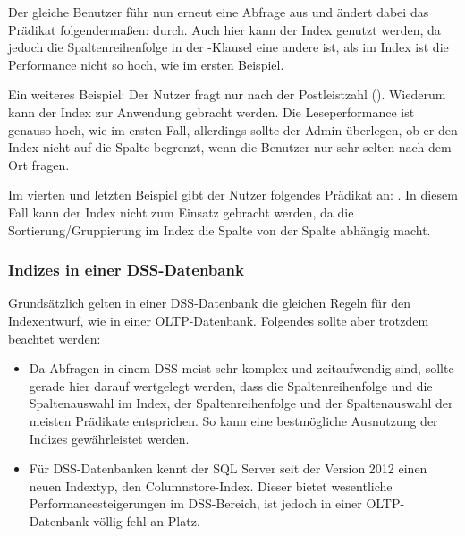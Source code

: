          Der gleiche Benutzer führ nun erneut eine Abfrage aus und ändert dabei
          das Prädikat folgendermaßen:
           durch. Auch
          hier kann der Index genutzt werden, da jedoch die Spaltenreihenfolge
          in der \WHERE-Klausel eine andere ist, als im Index ist die
          Performance nicht so hoch, wie im ersten Beispiel.
          
          Ein weiteres Beispiel: Der Nutzer fragt nur nach der Postleistzahl
          (). Wiederum kann der Index zur
          Anwendung gebracht werden. Die Leseperformance ist genauso hoch, wie
          im ersten Fall, allerdings sollte der Admin überlegen, ob er den Index
          nicht auf die Spalte  begrenzt, wenn die Benutzer nur
          sehr selten nach dem Ort fragen.
          
          Im vierten und letzten Beispiel gibt der Nutzer folgendes Prädikat an:
          . In diesem Fall kann der Index
          nicht zum Einsatz gebracht werden, da die Sortierung/Gruppierung im
          Index die Spalte  von der Spalte 
          abhängig macht.
        \subsubsection{Indizes in einer DSS-Datenbank}
          Grundsätzlich gelten in einer DSS-Datenbank die gleichen Regeln für
          den Indexentwurf, wie in einer OLTP-Datenbank. Folgendes sollte aber
          trotzdem beachtet werden:
          \begin{itemize}
              \item Da Abfragen in einem DSS meist sehr komplex und
              zeitaufwendig sind, sollte gerade hier darauf wertgelegt werden,
              dass die Spaltenreihenfolge und die Spaltenauswahl im Index, der
              Spaltenreihenfolge und der Spaltenauswahl der meisten Prädikate
              entsprichen. So kann eine bestmögliche Ausnutzung der Indizes
              gewährleistet werden.
              \item Für DSS-Datenbanken kennt der SQL Server seit der Version
              2012 einen neuen Indextyp, den Columnstore-Index. Dieser bietet
              wesentliche Performancesteigerungen im DSS-Bereich, ist jedoch in
              einer OLTP-Datenbank völlig fehl an Platz.
          \end{itemize}
